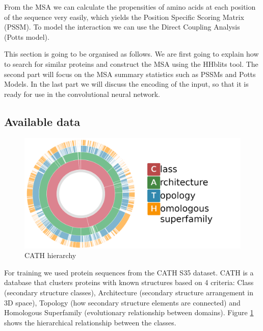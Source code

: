 From the MSA we can calculate the propensities of amino acids at each position of the sequence very easily, which yields the Position Specific Scoring Matrix (PSSM). 
To model the interaction we can use the Direct Coupling Analysis (Potts model).
    
This section is going to be organised as follows. 
We are first going to explain how to search for similar proteins and construct the MSA using the HHblits tool. 
The second part will focus on the MSA summary statistics such as PSSMs and Potts Models. 
In the last part we will discuss the encoding of the input, so that it is ready for use in the convolutional neural network.
    
\subsection{Available data}
    
\begin{figure}[b!]
    \centering
    \includegraphics[width=\linewidth]{imgs_tomas/cath.png}
    \caption{CATH hierarchy \cite{cath}}
    \label{fig:cath}
\end{figure}
    
For training we used protein sequences from the CATH S35 dataset. 
CATH is a database that clusters proteins with known structures based on 4 criteria: Class (secondary structure classes), Architecture (secondary structure arrangement in 3D space), Topology (how secondary structure elements are connected) and Homologous Superfamily (evolutionary relationship between domains). 
Figure \ref{fig:cath} shows the hierarchical relationship between the classes.
    
